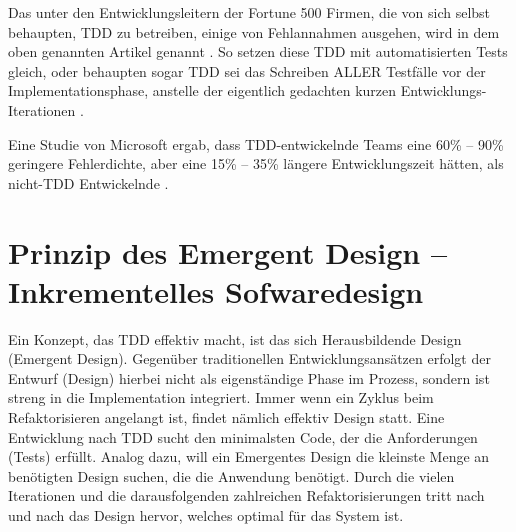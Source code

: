Das unter den Entwicklungsleitern der Fortune 500 Firmen, die von sich selbst behaupten, TDD zu betreiben, einige von Fehlannahmen ausgehen, wird in dem oben genannten Artikel genannt \citep{janzen_does_2008}. So setzen diese TDD mit automatisierten Tests gleich, oder behaupten sogar TDD sei das Schreiben ALLER Testfälle vor der Implementationsphase, anstelle der eigentlich gedachten kurzen Entwicklungs-Iterationen \citep{janzen_does_2008}.


Eine Studie von Microsoft ergab, dass TDD-entwickelnde Teams eine 60\% -- 90\% geringere Fehlerdichte, aber eine 15\% -- 35\% längere Entwicklungszeit hätten, als nicht-TDD Entwickelnde \citep{nagappan_realizing_2008}.



\section{Prinzip des Emergent Design -- Inkrementelles Sofwaredesign}
\label{sec:tddEmergent}





Ein Konzept, das TDD effektiv macht, ist das sich Herausbildende Design (Emergent Design). Gegenüber traditionellen Entwicklungsansätzen erfolgt der Entwurf (Design) hierbei nicht als eigenständige Phase im Prozess, sondern ist streng in die Implementation integriert. Immer wenn ein Zyklus beim Refaktorisieren angelangt ist, findet nämlich effektiv Design statt. Eine Entwicklung nach TDD sucht den minimalsten Code, der die Anforderungen (Tests) erfüllt. Analog dazu, will ein Emergentes Design die kleinste Menge an benötigten Design suchen, die die Anwendung benötigt. Durch die vielen Iterationen und die darausfolgenden zahlreichen Refaktorisierungen tritt nach und nach das Design hervor, welches optimal für das System ist.



